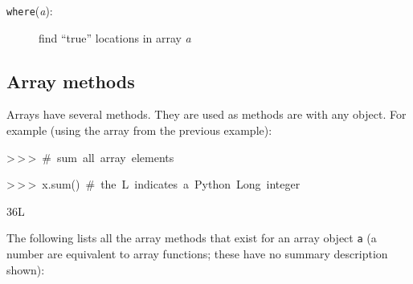 \begin{description}
\item [{\texttt{where}\textmd{(}\textmd{\emph{a}}\textmd{):}}] find {}``true''
locations in array \emph{a}
\end{description}

\subsection{Array methods}

\begin{singlespace}
Arrays have several methods. They are used as methods are with any
object. For example (using the array from the previous example):
\end{singlespace}

\begin{lyxcode}
\begin{singlespace}
>\,{}>\,{}>~\#~sum~all~array~elements

>\,{}>\,{}>~x.sum()~\#~the~L~indicates~a~Python~Long~integer

36L~\end{singlespace}

\end{lyxcode}
\begin{singlespace}
The following lists all the array methods that exist for an array
object \texttt{a} (a number are equivalent to array functions; these
have no summary description shown):
\end{singlespace}

